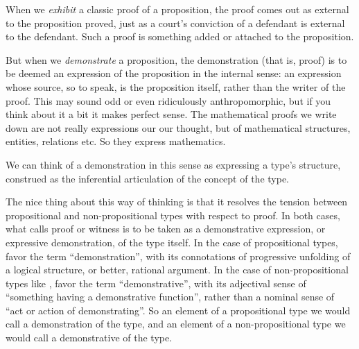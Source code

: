 When we \textit{exhibit} a classic proof of a proposition, the proof
comes out as external to the proposition proved, just as a court's
conviction of a defendant is external to the defendant.  Such a proof
is something added or attached to the proposition.

But when we \textit{demonstrate} a proposition, the demonstration (that is, proof)
is to be deemed an expression of the proposition in the internal
sense: an expression whose source, so to speak, is the proposition
itself, rather than the writer of the proof.  This may sound odd or
even ridiculously anthropomorphic, but if you think about it a bit it
makes perfect sense.  The mathematical proofs we write down are not
really expressions our our thought, but of mathematical structures,
entities, relations etc.  So they express
mathematics.

We can think of a demonstration in this sense as expressing a type's
structure, construed as the inferential articulation of the concept of
the type.

The nice thing about this way of thinking is that it resolves the
tension between propositional and non-propositional types with respect
to proof.  In both cases, what \HoTT{} calls proof or witness is to be
taken as a demonstrative expression, or expressive demonstration, of
the type itself.  In the case of propositional types, favor the term
``demonstration'', with its connotations of progressive unfolding of a
logical structure, or better, rational argument.  In the case of
non-propositional types like \N, favor the term ``demonstrative'',
with its adjectival sense of ``something having a demonstrative
function'', rather than a nominal sense of ``act or action of
demonstrating''.  So an element
of a propositional type we would call a demonstration of the type, and
an element of a non-propositional type we would call a demonstrative
of the type.

